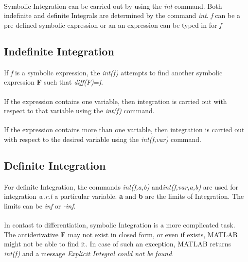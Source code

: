 \documentclass[]{article}
\begin{document}
\paragraph{}
Symbolic Integration can be carried out by using the \emph{int} command. Both indefinite and definite Integrals are determined by the command \emph{int}. \emph{f} can be a pre-defined symbolic expression or an an expression can be typed in for \emph{f}
\subsection{Indefinite Integration}
\paragraph{}
If \emph{f} is a symbolic expression, the \emph{int(f)} attempts to find another symbolic expression \textbf{F} such that \emph{diff(F)}=\emph{f}.
\paragraph{}
If the expression contains one variable, then integration is carried out with respect to that variable using the \emph{int(f)} command.
\paragraph{}
If the expression contains more than one variable, then integration is carried out with respect to the desired variable using the \emph{int(f,var)} command.

\subsection{Definite Integration}
\paragraph{}
For definite Integration, the commands \emph{int(f,a,b)} and\emph{int(f,var,a,b)} are used for integration \emph{w.r.t} a particular variable. \textbf{a} and \textbf{b} are the limits of Integration. The limits can be \emph{inf} or \emph{-inf}.
\paragraph{}
In contast to differentiation, symbolic Integration is a more complicated task. The antiderivative \textbf{F} may not exist in closed form, or even if exists, MATLAB might not be able to find it. In case of such an exception, MATLAB returns \emph{int(f)} and a message \emph{Explicit Integral could not be found.}
\end{document}
